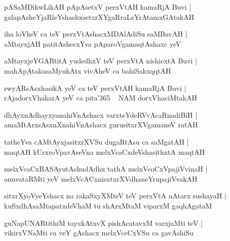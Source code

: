 \documentclass[twoside,12pt,openright]{book}
\newcounter{shloka}[chapter]
\begin{document}
\begin{shloka}%
pASaMDikwLikAH pApAsetxV perxVtAH kamaRjA Buvi |\\
galapAsheYjaRleYshashxsetxrXYgaRraLeYrAtamxGAtakAH 
\end{shloka}

\begin{shloka}%
iha loVkeV ca teV perxVtAshacxMDAlAdiSu saMBavAH |\\
aMtayxjAH patitAshecxYva pAparoVgamaqtAshaxc yeV 
\end{shloka}

\begin{shloka}%
aMtayxjeYGARtitA yudedhxV teV perxVtA nishicxtA Buvi |\\
mahApAtakasaMyukAtx vivAheV ca bahiSakxqqtAH 
\end{shloka}

\begin{shloka}%
swyARsAsxhasikA yeV ca teV perxVtAH kamaRjA Buvi |\\
rAjadorxVhakarA yeV ca pita\char'365 ~ NAM dorxVhaciMtakAH 
\end{shloka}

\begin{shloka}%
dhAyxnAdhayxyanahiVnAshacx varxteYdeRVvAcaRnadiBiH |\\
amaMtArxsAsxnXnahiVnAshacx gurusitxrXVgamaneV ratAH 
\end{shloka}

\begin{shloka}%
tatheYva cAMtAyxjasitxrXVSu dugaRtAsu ca saMgatAH |\\
maqtAH kUrxroVpavAseVna melxVcaCxdeVshasithxtA maqtAH 
\end{shloka}

\begin{shloka}%
melxVcaCxBASAyutAshudAdhx tathA melxVcoCxVpajiVvinaH |\\
anuvataRMti yeV melxVcACxnisxtxrXVdhaneYrupajiVvakAH 
\end{shloka}

\begin{shloka}%
sitxrXyoVyeYshacx na rakaSxyXMteV teV perxVtA nAtarx sushayaH |\\
kuSxdhAsaMtapatxdeVhaM tu shArxMtaM viparxM gaqhAgataM 
\end{shloka}

\begin{shloka}%
guNapUNARtithiM tayxkAtxvX pishAcatavxM varxjaMti teV |\\
vikirxVNaMti ca veY gAshacx melxVceCxVSu ca gavAshiSu 
\end{shloka}
\end{document}
